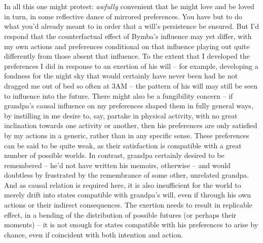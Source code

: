 \documentclass[twoside,10pt]{article}
\begin{document}
\begin{article*}
\\\\
In all this one might protest: \textit{awfully} convenient that he might love and be loved in turn, in some reflective dance of mirrored preferences. You have but to do what you’d already meant to in order that a will’s persistence be ensured. But I’d respond that the counterfactual effect of Bymba’s influence may yet differ, with my own actions and preferences conditional on that influence playing out quite differently from those absent that influence. To the extent that I developed the preferences I did in response to an exertion of his will – for example, developing a fondness for the night sky that would certainly have never been had he not dragged me out of bed so often at 3AM – the pattern of his will may still be seen to influence into the future. There might also be a fungibility concern – if grandpa’s causal influence on my preferences shaped them in fully general ways, by instilling in me desire to, say, partake in physical activity, with no great inclination towards one activity or another, then his preferences are only satisfied by my actions in a generic, rather than in any specific sense. These preferences can be said to be quite weak, as their satisfaction is compatible with a great number of possible worlds. In contrast, grandpa certainly desired to be remembered – he’d not have written his memoirs, otherwise – and would doubtless by frustrated by the remembrance of some other, unrelated grandpa. And as causal relation is required here, it is also insufficient for the world to merely drift into states compatible with grandpa’s will, even if through his own actions or their indirect consequences. The exertion needs to result in replicable effect, in a bending of the distribution of possible futures (or perhaps their moments) – it is not enough for states compatible with his preferences to arise by chance, even if coincident with both intention and action.
\\


\end{article*}
\end{document}
